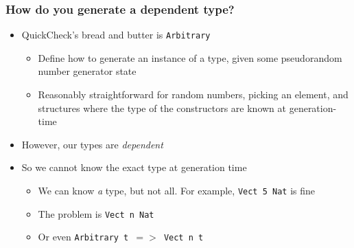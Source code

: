 \documentclass[compress,handout]{beamer}
\begin{document}


\begin{frame}
  \frametitle{How do you generate a dependent type?}

  \begin{itemize}
    \item QuickCheck's bread and butter is \texttt{Arbitrary}
    \begin{itemize}
      \item Define how to generate an instance of a type, given some
            pseudorandom number generator state
      \item Reasonably straightforward for random numbers, picking an element,
            and structures where the type of the constructors are known at
            generation-time
    \end{itemize}
    \item However, our types are \textit{dependent}
    \item So we cannot know the exact type at generation time
    \begin{itemize}
      \item We can know \textit{a} type, but not all. For example, \texttt{Vect
            5 Nat} is fine
      \item The problem is \texttt{Vect n Nat}
      \item Or even \texttt{Arbitrary t $=>$ Vect n t}
    \end{itemize}
  \end{itemize}

\end{frame}
\end{document}
